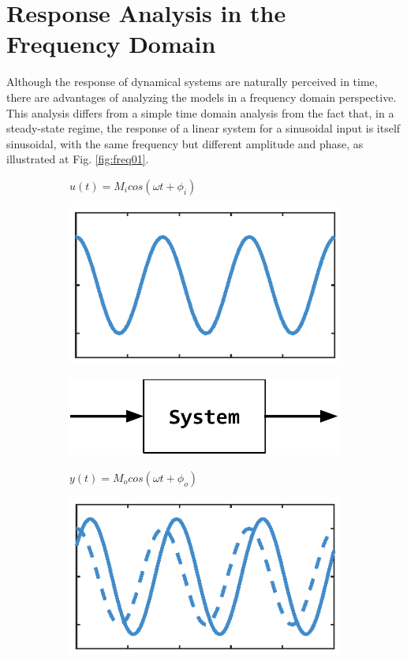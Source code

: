 \documentclass[a4paper,11pt]{book}
\numberwithin{figure}{chapter}
\numberwithin{equation}{chapter}
\numberwithin{table}{chapter}
\theoremstyle{definition}
\begin{document}
\section{Response Analysis in the Frequency Domain}

Although the response of dynamical systems are naturally perceived in time, there are advantages of analyzing the models in a frequency domain perspective. This analysis differs from a simple time domain analysis from the fact that, in a steady-state regime, the response of a linear system for a sinusoidal input is itself sinusoidal, with the same frequency but different amplitude and phase, as illustrated at Fig. \ref{fig:freq01}.

\begin{figure}[ht] 
    \centering
    \begin{subfigure}{0.25\textwidth}   
        \centering
        $u(t) = M_i cos(\omega t + \phi_i)$\par\medskip
        \includegraphics[scale=0.55]{chapter2/freq01_1}
    \end{subfigure}
    \begin{subfigure}{0.38\textwidth}   
        \centering
        \includegraphics[scale=0.6]{chapter2/freq01_2}
    \end{subfigure}
    \begin{subfigure}{0.25\textwidth}   
        \centering
        $y(t) = M_o cos(\omega t + \phi_o)$\par\medskip
        \includegraphics[scale=0.55]{chapter2/freq01_3}
    \end{subfigure}
    

\end{figure}
\end{document}
